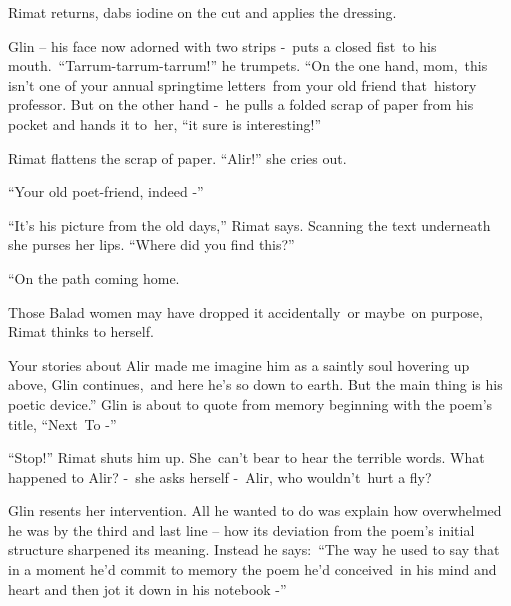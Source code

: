 \documentclass[letterpaper]{article}
\begin{document}
\textcolor[rgb]{0.13333334,0.13333334,0.13333334}{Rimat returns, dabs iodine on the cut and }applies the
dressing\textcolor[rgb]{0.0,0.4392157,0.7529412}{. }

\textcolor[rgb]{0.13333334,0.13333334,0.13333334}{Glin }{}-- his face now adorned with two strips
-\textcolor[rgb]{0.0,0.4392157,0.7529412}{\ }\textcolor[rgb]{0.13333334,0.13333334,0.13333334}{puts }a closed
fist\ \textcolor[rgb]{0.13333334,0.13333334,0.13333334}{to his mouth.\ }{}``Tarrum-tarrum-tarrum!{}'' he trumpets. ``On
the one hand, mom,\textcolor[rgb]{0.13333334,0.13333334,0.13333334}{\ this isn{}'t one of your annual springtime
letters\ from your old friend that}\textcolor{red}{\ }\textcolor[rgb]{0.13333334,0.13333334,0.13333334}{history
professor. But on the other hand -{\textquotedbl}\ he pulls a folded scrap of paper from his pocket and hands it
to\ }her,\textcolor[rgb]{0.13333334,0.13333334,0.13333334}{ ``it sure is interesting!{}'' }

\textcolor[rgb]{0.13333334,0.13333334,0.13333334}{Rimat flattens the scrap of paper. ``Alir!'' she cries out.}

\textcolor[rgb]{0.13333334,0.13333334,0.13333334}{{}``Your old poet-friend, indeed -{}''}

\textcolor[rgb]{0.13333334,0.13333334,0.13333334}{{}``It's his picture from the old days,{}'' Rimat says. Scanning the
text underneath she purses her lips. ``Where did you find this?{}''\ }

\textcolor[rgb]{0.13333334,0.13333334,0.13333334}{{}``On the path coming home.{\textquotedbl}\ }

Those Balad women may have dropped it accidentally\ or maybe\ on purpose, Rimat thinks to
herself\textcolor[rgb]{0.13333334,0.13333334,0.13333334}{.\ }

\textcolor[rgb]{0.13333334,0.13333334,0.13333334}{{\textquotedbl}Your stories about Alir made me imagine him as a
saintly soul hovering up above,{\textquotedbl} Glin continues,\ {\textquotedbl}and here he's so down to earth. But the
main thing is his poetic device.'' Glin is about to quote from memory beginning with the poem's title, ``Next\ To {}-''
}

\textcolor[rgb]{0.13333334,0.13333334,0.13333334}{{}``Stop!'' Rimat }shuts him
up\textcolor[rgb]{0.13333334,0.13333334,0.13333334}{. She\ can{}'t bear to hear the terrible words. What happened to
Alir? -\ she asks herself -\ Alir, who wouldn't~hurt a fly?}

\textcolor[rgb]{0.13333334,0.13333334,0.13333334}{Glin }resents her intervention. All he wanted to do
was\textcolor[rgb]{0.13333334,0.13333334,0.13333334}{ explain how overwhelmed he was by the third and last line -- how
its deviation from the poem's initial structure sharpened its meaning. Instead he says:\ {}``The way he used to say
that in a moment he'd commit to memory the poem }he'd conceived\ in his mind and heart
\textcolor[rgb]{0.13333334,0.13333334,0.13333334}{and then jot it down in his notebook -{}'' }
\end{document}

